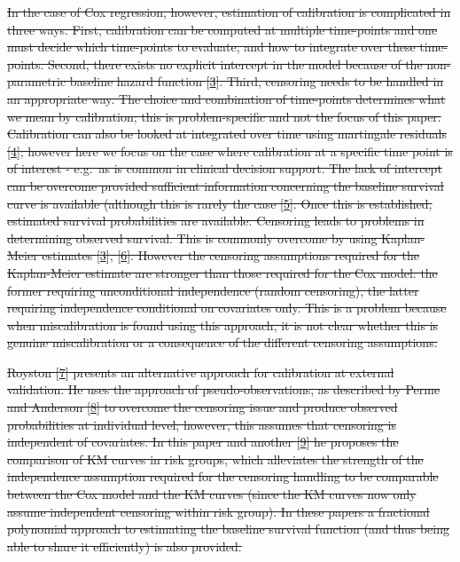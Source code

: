 \documentclass[
]{article}
\begin{document}
\sout{In the case of Cox regression, however, estimation of calibration is complicated in three ways. First, calibration can be computed at multiple time-points and one must decide which time-points to evaluate, and how to integrate over these time-points. Second, there exists no explicit intercept in the model because of the non-parametric baseline hazard function {[}\protect\hyperlink{ref-royston_external_2013}{3}{]}. Third, censoring needs to be handled in an appropriate way. The choice and combination of time-points determines what we mean by calibration; this is problem-specific and not the focus of this paper. Calibration can also be looked at integrated over time using martingale residuals {[}\protect\hyperlink{ref-crowson_assessing_2016}{4}{]}; however here we focus on the case where calibration at a specific time point is of interest - e.g.~as is common in clinical decision support. The lack of intercept can be overcome provided sufficient information concerning the baseline survival curve is available (although this is rarely the case {[}\protect\hyperlink{ref-houwelingen_validation_2000}{5}{]}. Once this is established, estimated survival probabilities are available. Censoring leads to problems in determining observed survival. This is commonly overcome by using Kaplan-Meier estimates {[}\protect\hyperlink{ref-royston_external_2013}{3}{]}, {[}\protect\hyperlink{ref-hippisley-cox_derivation_2007}{6}{]}. However the censoring assumptions required for the Kaplan-Meier estimate are stronger than those required for the Cox model: the former requiring unconditional independence (random censoring), the latter requiring independence conditional on covariates only. This is a problem because when miscalibration is found using this approach, it is not clear whether this is genuine miscalibration or a consequence of the different censoring assumptions.}

\sout{Royston {[}\protect\hyperlink{ref-royston_tools_2014}{7}{]} presents an alternative approach for calibration at external validation. He uses the approach of pseudo-observations, as described by Perme and Anderson {[}\protect\hyperlink{ref-perme_checking_2008}{8}{]} to overcome the censoring issue and produce observed probabilities at individual level; however, this assumes that censoring is independent of covariates. In this paper and another {[}\protect\hyperlink{ref-royston_tools_2015}{9}{]} he proposes the comparison of KM curves in risk groups, which alleviates the strength of the independence assumption required for the censoring handling to be comparable between the Cox model and the KM curves (since the KM curves now only assume independent censoring within risk group). In these papers a fractional polynomial approach to estimating the baseline survival function (and thus being able to share it efficiently) is also provided.}
\end{document}
